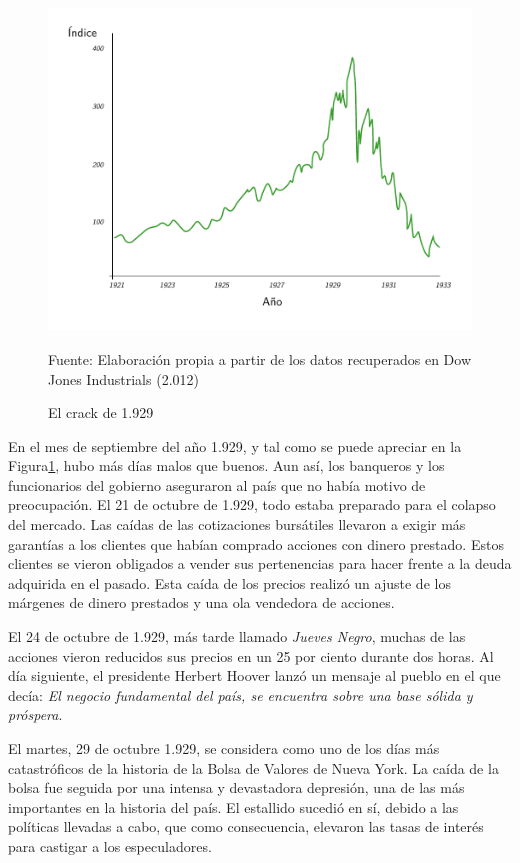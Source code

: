 \begin{figure}[!h] 
\caption{El crack de 1.929} 
\centering \includegraphics[width=150mm]{capitulos/graficos/1929Bubble} 
\label{fig:El crack de 1.929} 

	\footnotesize
	Fuente: Elaboración propia a partir de los datos recuperados en Dow Jones Industrials (2.012)

\end{figure}

En el mes de septiembre del año 1.929, y tal como se puede apreciar en la Figura\ref{fig:El crack de 1.929}, hubo más días malos que buenos. Aun así, los banqueros y los funcionarios del gobierno aseguraron al país que no había motivo de preocupación. El 21 de octubre de 1.929, todo estaba preparado para el colapso del mercado. Las caídas de las cotizaciones bursátiles llevaron a exigir más garantías a los clientes que habían comprado acciones con dinero prestado. Estos clientes se vieron obligados a vender sus pertenencias para hacer frente a la deuda adquirida en el pasado. Esta caída de los precios realizó un ajuste de los márgenes de dinero prestados y una ola vendedora de acciones. 

El 24 de octubre de 1.929, más tarde llamado \emph{Jueves Negro}, muchas de las acciones vieron reducidos sus precios en un 25 por ciento durante dos horas. Al día siguiente, el presidente Herbert Hoover lanzó un mensaje al pueblo en el que decía: \emph{El negocio fundamental del país, se encuentra sobre una base sólida y próspera}.

El martes, 29 de octubre 1.929, se considera como uno de los días más catastróficos de la historia de la Bolsa de Valores de Nueva York. La caída de la bolsa fue seguida por una intensa y devastadora depresión, una de las más importantes en la historia del país. El estallido sucedió en sí, debido a las políticas llevadas a cabo, que como consecuencia, elevaron las tasas de interés para castigar a los especuladores.

